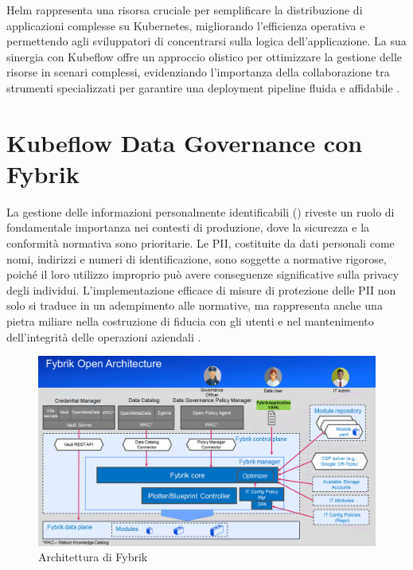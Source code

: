 Helm rappresenta una risorsa cruciale per semplificare la distribuzione di applicazioni complesse su Kubernetes, migliorando l'efficienza operativa e permettendo agli sviluppatori di concentrarsi sulla logica dell'applicazione. La sua sinergia con Kubeflow offre un approccio olistico per ottimizzare la gestione delle risorse in scenari complessi, evidenziando l'importanza della collaborazione tra strumenti specializzati per garantire una deployment pipeline fluida e affidabile \cite{helm_kubeflow_collaboration}.

\section{Kubeflow Data Governance con Fybrik}

La gestione delle informazioni personalmente identificabili () riveste un ruolo di fondamentale importanza nei contesti di produzione, dove la sicurezza e la conformità normativa sono prioritarie. Le PII, costituite da dati personali come nomi, indirizzi e numeri di identificazione, sono soggette a normative rigorose, poiché il loro utilizzo improprio può avere conseguenze significative sulla privacy degli individui. L'implementazione efficace di misure di protezione delle PII non solo si traduce in un adempimento alle normative, ma rappresenta anche una pietra miliare nella costruzione di fiducia con gli utenti e nel mantenimento dell'integrità delle operazioni aziendali \cite{pii_importance}.

\begin{figure}[h]
    \centering
    \includegraphics[width=\linewidth]{figures/ch6/fybrik.png}
    \caption[Architettura di Fybrik]{Architettura di Fybrik}
    \label{fig:cha6:fybrik}
\end{figure}

